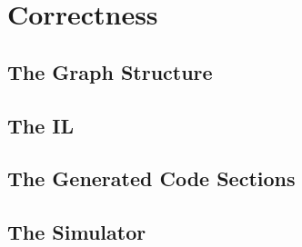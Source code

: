 \section{Correctness}
\subsection{The Graph Structure}

\subsection{The IL}
\subsection{The Generated Code Sections}
\subsection{The Simulator}